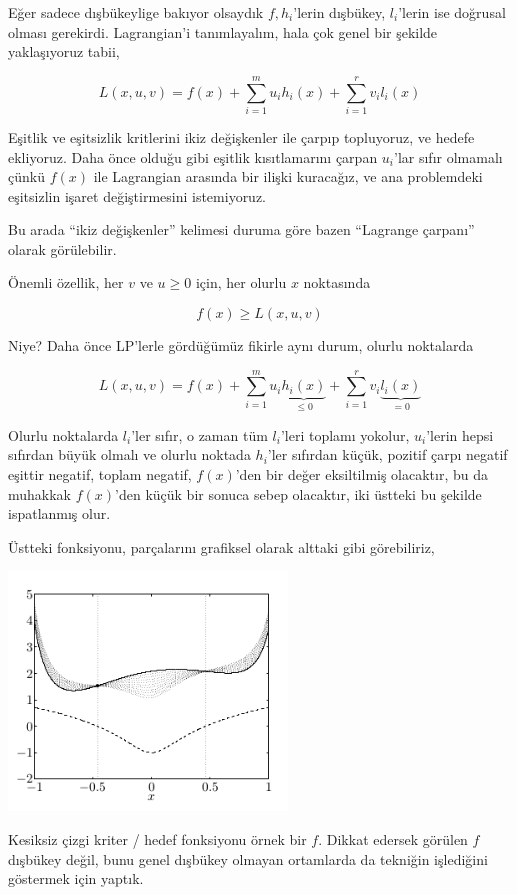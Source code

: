 \documentclass[12pt,fleqn]{article}\usepackage{../../common}
\begin{document}
Eğer sadece dışbükeylige bakıyor olsaydık $f,h_i$'lerin dışbükey,
$l_i$'lerin ise doğrusal olması gerekirdi. Lagrangian'i tanımlayalım, hala
çok genel bir şekilde yaklaşıyoruz tabii, 

$$
L(x,u,v) = f(x) + \sum_{i=1}^{m} u_i h_i(x) + \sum_{i=1}^{r} v_i l_i(x) 
$$

Eşitlik ve eşitsizlik kritlerini ikiz değişkenler ile çarpıp topluyoruz, ve
hedefe ekliyoruz. Daha önce olduğu gibi eşitlik kısıtlamarını çarpan
$u_i$'lar sıfır olmamalı çünkü $f(x)$ ile Lagrangian arasında bir ilişki
kuracağız, ve ana problemdeki eşitsizlin işaret değiştirmesini
istemiyoruz. 

Bu arada ``ikiz değişkenler'' kelimesi duruma göre bazen ``Lagrange
çarpanı'' olarak görülebilir. 

Önemli özellik, her $v$ ve $u \ge 0$ için, her olurlu $x$ noktasında

$$
f(x) \ge L(x,u,v)
$$

Niye? Daha önce LP'lerle gördüğümüz fikirle aynı durum, olurlu noktalarda

$$
L(x,u,v) =  f(x) + 
\sum_{i=1}^{m} u_i \underbrace{h_i(x)}_{\le 0} + 
\sum_{i=1}^{r} v_i \underbrace{l_i(x)}_{=0}
$$

Olurlu noktalarda $l_i$'ler sıfır, o zaman tüm $l_i$'leri toplamı yokolur,
$u_i$'lerin hepsi sıfırdan büyük olmalı ve olurlu noktada $h_i$'ler
sıfırdan küçük, pozitif çarpı negatif eşittir negatif, toplam negatif,
$f(x)$'den bir değer eksiltilmiş olacaktır, bu da muhakkak $f(x)$'den küçük
bir sonuca sebep olacaktır, iki üstteki bu şekilde ispatlanmış olur.

Üstteki fonksiyonu, parçalarını grafiksel olarak alttaki gibi görebiliriz,

\includegraphics[width=20em]{func_56_gendual_01.png}

Kesiksiz çizgi kriter / hedef fonksiyonu örnek bir $f$. Dikkat edersek
görülen $f$ dışbükey değil, bunu genel dışbükey olmayan ortamlarda da
tekniğin işlediğini göstermek için yaptık. 
\end{document}
